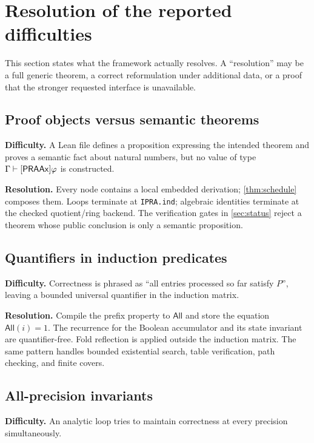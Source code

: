 \section{Resolution of the reported difficulties}\label{sec:difficulties}

This section states what the framework actually resolves.  A ``resolution'' may be a full generic theorem, a correct reformulation under additional data, or a proof that the stronger requested interface is unavailable.

\subsection{Proof objects versus semantic theorems}

\textbf{Difficulty.}  A Lean file defines a proposition expressing the intended theorem and proves a semantic fact about natural numbers, but no value of type \(\Gamma\vdash[\mathsf{PRAAx}]\varphi\) is constructed.

\textbf{Resolution.}  Every node contains a local embedded derivation; \cref{thm:schedule} composes them.  Loops terminate at \texttt{IPRA.ind}; algebraic identities terminate at the checked quotient/ring backend.  The verification gates in \cref{sec:status} reject a theorem whose public conclusion is only a semantic proposition.

\subsection{Quantifiers in induction predicates}

\textbf{Difficulty.}  Correctness is phrased as ``all entries processed so far satisfy \(P\)'', leaving a bounded universal quantifier in the induction matrix.

\textbf{Resolution.}  Compile the prefix property to \(\mathsf{All}\) and store the equation \(\mathsf{All}(i)=1\).  The recurrence for the Boolean accumulator and its state invariant are quantifier-free.  Fold reflection is applied outside the induction matrix.  The same pattern handles bounded existential search, table verification, path checking, and finite covers.

\subsection{All-precision invariants}

\textbf{Difficulty.}  An analytic loop tries to maintain correctness at every precision simultaneously.

